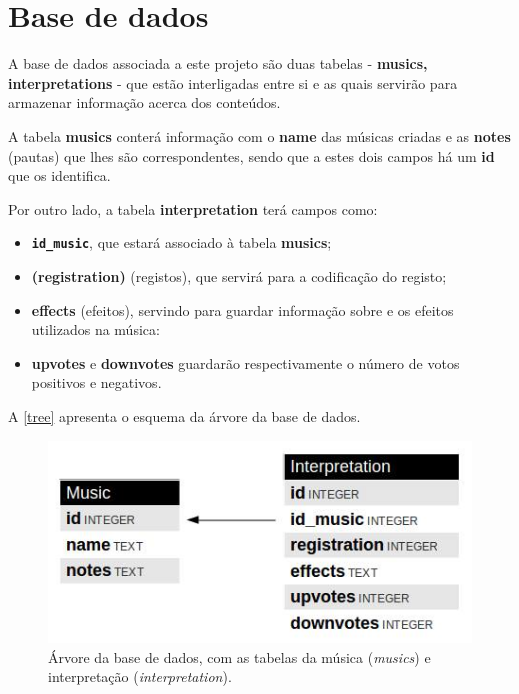 \chapter{Base de dados}
\label{chap.base}

A base de dados associada a este projeto são duas tabelas - \textbf{musics, interpretations} - que estão interligadas entre si e as quais servirão para armazenar informação acerca dos conteúdos.

A tabela \textbf{musics} conterá informação com o \textbf{name} das músicas criadas e as \textbf{notes} (pautas) que lhes são correspondentes, sendo que a estes dois campos há um \textbf{id} que os identifica.

Por outro lado, a tabela \textbf{interpretation} terá campos como:

\begin{itemize}
\item\textbf{\texttt{id\_music}}, que estará associado à tabela \textbf{musics};
\item\textbf{(registration)} (registos), que servirá para a codificação do registo;
\item\textbf{effects} (efeitos), servindo para guardar informação sobre e os efeitos utilizados na música:
\item\textbf{upvotes} e \textbf{downvotes} guardarão respectivamente o número de votos positivos e negativos.
\end{itemize}

A \autoref{tree} apresenta o esquema da árvore da base de dados.

\begin{figure}[htp]
\centering
\includegraphics[width=\textwidth]{images/tree.jpg}
\caption{Árvore da base de dados, com as tabelas da música (\emph{musics}) e interpretação (\emph{interpretation}).}
\label{tree}
\end{figure}

